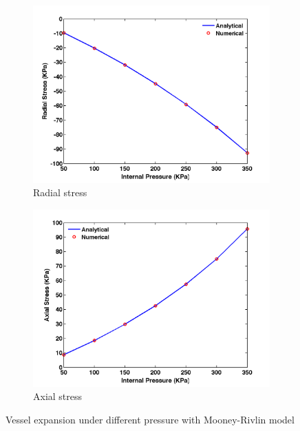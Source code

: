 \begin{figure}[H]
	\begin{subfigure}[b]{0.5\textwidth}
		\centering
		\includegraphics[width=\textwidth]{./figures/radial.png}
		\caption{Radial stress}
		\label{radial}
	\end{subfigure}
	\begin{subfigure}[b]{0.5\textwidth}
		\centering
		\includegraphics[width=\textwidth]{./figures/axial.png}
		\caption{Axial stress}
		\label{axial}
	\end{subfigure}
	\caption{Vessel expansion under different pressure with Mooney-Rivlin model}
	\label{fig:mooney-rivlin2}
\end{figure}

